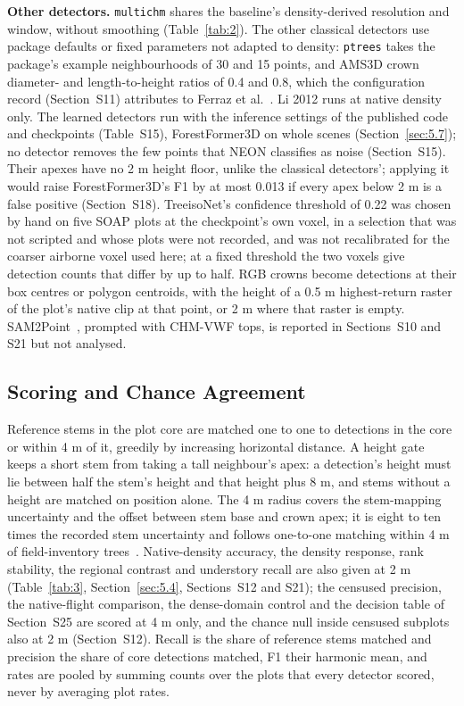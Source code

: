 \documentclass[journal]{IEEEtran}
\begin{document}
\textbf{Other detectors.} \texttt{multichm} shares the baseline's density-derived resolution
and window, without smoothing (Table~\ref{tab:2}). The other classical detectors use
package defaults or fixed parameters not adapted to density: \texttt{ptrees} takes the
package's example neighbourhoods of 30 and 15 points, and AMS3D crown diameter-
and length-to-height ratios of 0.4 and 0.8, which the configuration record
(Section~S11) attributes to Ferraz et al.~\cite{ferraz2016lidar}. Li 2012 runs at native density
only. The learned detectors run with the inference settings of the published
code and checkpoints (Table~S15), ForestFormer3D on whole scenes (Section~\ref{sec:5.7});
no detector removes the few points that NEON classifies as noise (Section~S15).
Their apexes have no 2 m height floor, unlike the classical detectors'; applying
it would raise ForestFormer3D's F1 by at most 0.013 if every apex below 2 m is a
false positive (Section~S18). TreeisoNet's confidence threshold of 0.22 was
chosen by hand on five SOAP plots at the checkpoint's own voxel, in a selection
that was not scripted and whose plots were not recorded, and was not
recalibrated for the coarser airborne voxel used here; at a fixed threshold the
two voxels give detection counts that differ by up to half. RGB crowns become
detections at their box centres or polygon centroids, with the height of a 0.5 m
highest-return raster of the plot's native clip at that point, or 2 m where that
raster is empty. SAM2Point~\cite{guo2024sam2point}, prompted with CHM-VWF tops, is
reported in Sections~S10 and S21 but not analysed.

\subsection{Scoring and Chance Agreement}\label{sec:4.2}

Reference stems in the plot core are matched one to one to detections in the
core or within 4 m of it, greedily by increasing horizontal distance. A height
gate keeps a short stem from taking a tall neighbour's apex: a detection's
height must lie between half the stem's height and that height plus 8 m, and
stems without a height are matched on position alone. The 4 m radius covers the
stem-mapping uncertainty and the offset between stem base and crown apex; it is
eight to ten times the recorded stem uncertainty and follows one-to-one matching
within 4 m of field-inventory trees~\cite{gominski2025mining}. Native-density
accuracy, the density response, rank stability, the regional contrast and
understory recall are also given at 2 m (Table~\ref{tab:3}, Section~\ref{sec:5.4}, Sections~S12 and
S21); the censused precision, the native-flight comparison, the dense-domain
control and the decision table of Section~S25 are scored at 4 m only, and the
chance null inside censused subplots also at 2 m (Section~S12). Recall is the
share of reference stems matched and precision the share of core detections
matched, F1 their harmonic mean, and rates are pooled by summing counts over the
plots that every detector scored, never by averaging plot rates.
\end{document}
